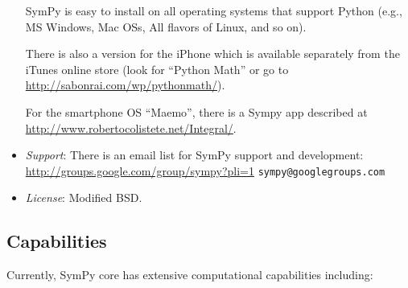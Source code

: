 \documentclass[12pt]{article}
\begin{document}
\begin{itemize}
SymPy is easy to install on all operating systems that
support Python (e.g., MS Windows, Mac OSs, All flavors of Linux, and
so on).

There is also a version for the iPhone which is available separately
from the iTunes online store (look for ``Python Math'' or
go to \url{http://sabonrai.com/wp/pythonmath/}).

For the smartphone OS ``Maemo'', there is a Sympy app described at
\url{http://www.robertocolistete.net/Integral/}.


\item
{\it Support}:
\newline
There is an email list for SymPy support and development:
\newline
\url{http://groups.google.com/group/sympy?pli=1}
\newline
{\tt sympy@googlegroups.com}


\item
{\it License}:
\newline
Modified BSD.

\end{itemize}



\subsection{Capabilities}

Currently, SymPy core has extensive computational capabilities including:
\end{document}
